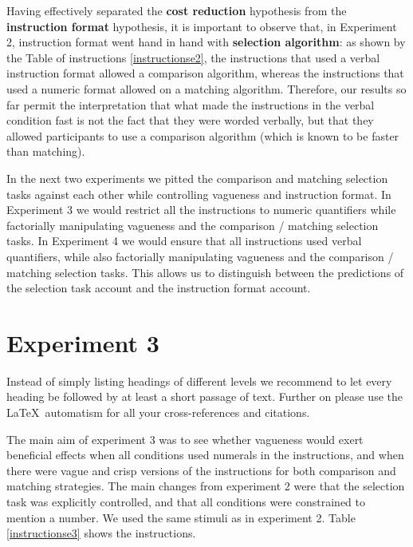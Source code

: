 \documentclass[graybox,envcountchap,sectrefs%
,footinfo
]{svmono}
\begin{document}
Having effectively separated the {\bf cost reduction} hypothesis from the {\bf instruction format} hypothesis, it is important to observe that, in Experiment 2, instruction format went hand in hand with {\bf selection algorithm}: as shown by the Table of instructions \ref{instructionse2}, the instructions that used a verbal instruction format allowed a comparison algorithm, whereas the instructions that used a numeric format allowed on a matching algorithm. Therefore, our results so far permit the interpretation that what made the instructions in the verbal condition fast is not the fact that they were worded verbally, but that they allowed participants to use a comparison algorithm (which is known to be faster than matching). %

In the next two experiments we pitted the comparison and matching selection tasks against each other while controlling vagueness and instruction format. In Experiment 3 we would restrict all the instructions to numeric quantifiers while factorially manipulating vagueness and the comparison / matching selection tasks. In Experiment 4 we would ensure that all instructions used verbal quantifiers, while also factorially manipulating vagueness and the comparison / matching selection tasks. This allows us to distinguish between the predictions of the selection task account and the instruction format account. 




\section{Experiment 3}
\label{sec:4}
Instead of simply listing headings of different levels we recommend to let every heading be followed by at least a short passage of text. Further on please use the \LaTeX\ automatism for all your cross-references and citations.

The main aim of experiment 3 was to see whether vagueness would exert beneficial effects when all conditions used numerals in the instructions, and when there were vague and crisp versions of the instructions for both comparison and matching strategies. The main changes from experiment 2 were that the selection task was explicitly controlled, and that all conditions were constrained to mention a number. We used the same stimuli as in experiment 2. Table \ref{instructionse3} shows the instructions. %
\end{document}
